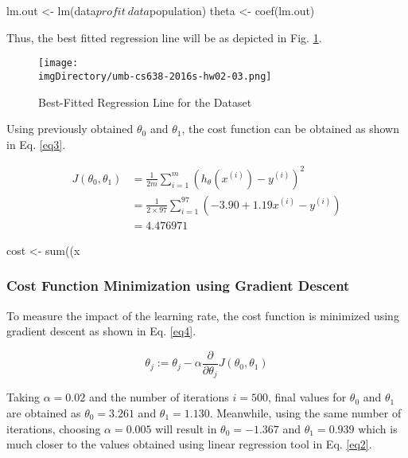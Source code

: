 \documentclass[12pt,letterpaper,twoside]{article}
\begin{document}
\begin{terminal}
lm.out <- lm(data$profit ~ data$population)
theta <- coef(lm.out)
\end{terminal}

Thus, the best fitted regression line will be as depicted in Fig. \ref{fig2}.

\begin{figure}[H]\centering
\texttt{[image: \\imgDirectory/umb-cs638-2016s-hw02-03.png]}
\caption{Best-Fitted Regression Line for the Dataset}\label{fig2}
\end{figure}

Using previously obtained $\theta_0$ and $\theta_1$, the cost function can be obtained as shown in Eq. \ref{eq3}.

\begin{equation}\label{eq3}
\begin{split}
J(\theta_0, \theta_1) & = \frac{1}{2m}\sum\limits_{i=1}^m \left(h_{\theta}(x^{(i)})-y^{(i)}\right)^{2} \\
 & = \frac{1}{2 \times 97}\sum\limits_{i=1}^{97} \left({-3.90} + {1.19}x^{(i)} - y^{(i)}\right)\\
 & = 4.476971
\end{split}
\end{equation}

\begin{terminal}
cost <- sum((x%
\end{terminal}

\subsubsection*{Cost Function Minimization using Gradient Descent}

To measure the impact of the learning rate, the cost function is minimized using gradient descent as shown in Eq. \ref{eq4}.

\begin{equation}\label{eq4}
\theta_j := \theta_j - \alpha \frac{\partial}{\partial\theta_j}J(\theta_0, \theta_1)
\end{equation}

Taking $\alpha = 0.02$ and the number of iterations $i = 500$, final values for $\theta_0$ and $\theta_1$ are obtained as $\theta_0 = 3.261$ and $\theta_1 = 1.130$.
Meanwhile, using the same number of iterations, choosing $\alpha = 0.005$ will result in $\theta_0 = -1.367$ and $\theta_1 = 0.939$ which is much closer to the values obtained using linear regression tool in Eq. \ref{eq2}.
\end{document}
